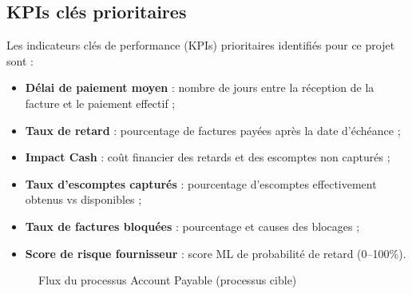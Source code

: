 \subsection{KPIs clés prioritaires}

Les indicateurs clés de performance (KPIs) prioritaires identifiés pour ce projet sont :

\begin{itemize}
    \item \textbf{Délai de paiement moyen} : nombre de jours entre la réception de la facture et le paiement effectif ;
    \item \textbf{Taux de retard} : pourcentage de factures payées après la date d'échéance ;
    \item \textbf{Impact Cash} : coût financier des retards et des escomptes non capturés ;
    \item \textbf{Taux d'escomptes capturés} : pourcentage d'escomptes effectivement obtenus vs disponibles ;
    \item \textbf{Taux de factures bloquées} : pourcentage et causes des blocages ;
    \item \textbf{Score de risque fournisseur} : score ML de probabilité de retard (0--100\%).
\end{itemize}

\begin{figure}[htbp]
    \centering
    \caption{Flux du processus Account Payable (processus cible)}
    \label{fig:processus_ap}
\end{figure}
